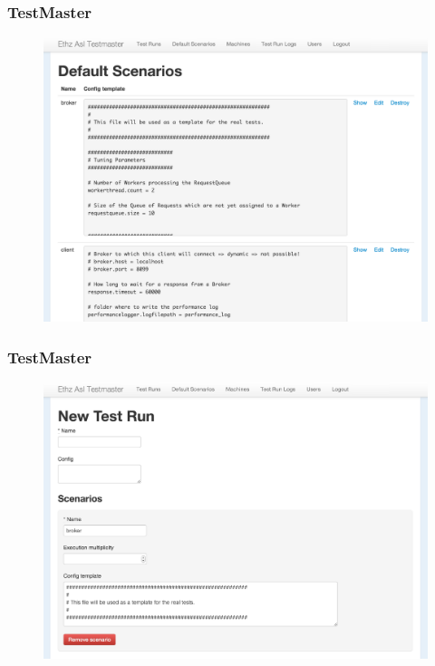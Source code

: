\documentclass{beamer}
\begin{document}
\begin{frame}
\frametitle{TestMaster}
\begin{figure}
  \begin{center}
    \includegraphics[scale=0.3]{../../drawings/TestMaster01.png}
  \end{center}
  \label{fig:testsystem}
\end{figure}
\end{frame}



\begin{frame}
\frametitle{TestMaster}
\begin{figure}
  \begin{center}
    \includegraphics[scale=0.3]{../../drawings/TestMaster02.png}
  \end{center}
  \label{fig:testsystem}
\end{figure}
\end{frame}
\end{document}
